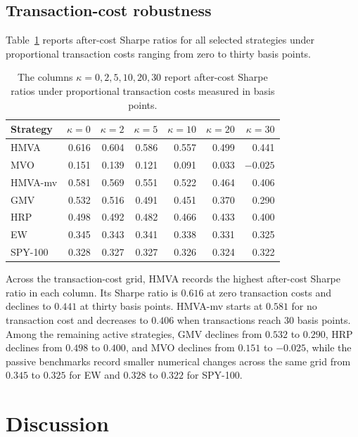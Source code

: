 \documentclass[12pt]{article}
\begin{document}
\subsection{Transaction-cost robustness}
\label{sec:cost_robustness}

Table~\ref{tab:cost_robustness_summary} reports after-cost Sharpe ratios for all selected strategies under proportional transaction costs ranging from zero to thirty basis points.

\begin{table}[!ht]
\centering
\caption{The columns $\kappa=0,2,5,10,20,30$ report after-cost Sharpe ratios under proportional  transaction costs measured in basis points.}
\label{tab:cost_robustness_summary}
\begin{tabular}{lrrrrrr}
\toprule
Strategy & $\kappa=0$ & $\kappa=2$ & $\kappa=5$ & $\kappa=10$ & $\kappa=20$ & $\kappa=30$ \\
\midrule
HMVA    & 0.616 & 0.604 & 0.586 & 0.557 & 0.499 & 0.441 \\
MVO     & 0.151 & 0.139 & 0.121 & 0.091 & 0.033 & $-0.025$ \\
\midrule
HMVA-mv & 0.581 & 0.569 & 0.551 & 0.522 & 0.464 & 0.406 \\
GMV     & 0.532 & 0.516 & 0.491 & 0.451 & 0.370 & 0.290 \\
HRP     & 0.498 & 0.492 & 0.482 & 0.466 & 0.433 & 0.400 \\
\midrule
EW      & 0.345 & 0.343 & 0.341 & 0.338 & 0.331 & 0.325 \\
SPY-100 & 0.328 & 0.327 & 0.327 & 0.326 & 0.324 & 0.322 \\
\bottomrule
\end{tabular}
\end{table}

Across the transaction-cost grid, HMVA records the highest after-cost Sharpe ratio in each column. Its Sharpe ratio is $0.616$ at zero transaction costs and declines to $0.441$ at thirty basis points. HMVA-mv starts at $0.581$ for no transaction cost and decreases to $0.406$ when transactions reach 30 basis points. Among the remaining active strategies, GMV declines from $0.532$ to $0.290$, HRP declines from $0.498$ to $0.400$, and MVO declines from $0.151$ to $-0.025$, while the passive benchmarks record smaller numerical changes across the same grid from $0.345$ to $0.325$ for EW and $0.328$ to $0.322$ for SPY-100.

\section{Discussion}
\label{sec:discussion}
\end{document}
